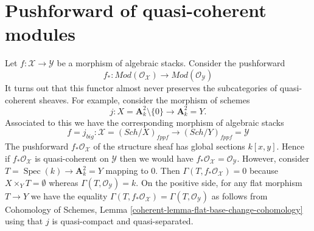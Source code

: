 \documentclass{stacks-project}
\theoremstyle{plain}
\theoremstyle{definition}
\theoremstyle{remark}
\numberwithin{equation}{subsection}
\def\Spec{\mathop{\mathrm{Spec}}}
\def\Sch{\mathit{Sch}}
\begin{document}
\section{Pushforward of quasi-coherent modules}
\label{section-pushforward-quasi-coherent}

\noindent
Let $f : \mathcal{X} \to \mathcal{Y}$ be a morphism of algebraic stacks.
Consider the pushforward
$$
f_* :
\textit{Mod}(\mathcal{O}_\mathcal{X})
\longrightarrow
\textit{Mod}(\mathcal{O}_\mathcal{Y})
$$
It turns out that this functor almost never preserves the subcategories
of quasi-coherent sheaves. For example, consider the morphism of schemes
$$
j : X = \mathbf{A}^2_k \setminus \{0\} \longrightarrow \mathbf{A}^2_k = Y.
$$
Associated to this we have the corresponding morphism of algebraic stacks
$$
f = j_{big} : \mathcal{X} = (\Sch/X)_{fppf} \to
(\Sch/Y)_{fppf} = \mathcal{Y}
$$
The pushforward $f_*\mathcal{O}_\mathcal{X}$ of the structure sheaf has
global sections $k[x, y]$. Hence if $f_*\mathcal{O}_\mathcal{X}$ is
quasi-coherent on $\mathcal{Y}$ then we would have
$f_*\mathcal{O}_\mathcal{X} = \mathcal{O}_\mathcal{Y}$. However,
consider $T = \Spec(k) \to \mathbf{A}^2_k = Y$ mapping to $0$.
Then $\Gamma(T, f_*\mathcal{O}_\mathcal{X}) = 0$ because
$X \times_Y T = \emptyset$ whereas $\Gamma(T, \mathcal{O}_\mathcal{Y}) = k$.
On the positive side, for any flat morphism $T \to Y$ we have the equality
$\Gamma(T, f_*\mathcal{O}_\mathcal{X}) = \Gamma(T, \mathcal{O}_\mathcal{Y})$
as follows from
Cohomology of Schemes, Lemma \ref{coherent-lemma-flat-base-change-cohomology}
using that $j$ is quasi-compact and quasi-separated.
\end{document}
